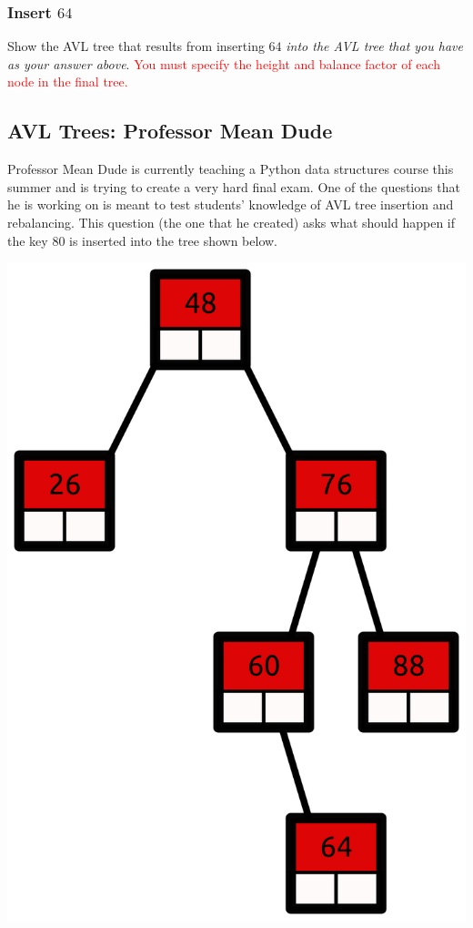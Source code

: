\documentclass{article}
\begin{document}
\begin{mdframed}
\vspace{3em}
\end{mdframed}

\subsubsection{Insert $64$}

Show the AVL tree that results from inserting $64$ \textit{into the AVL tree that you have as your answer above}. \textcolor{red}{You must specify the height and balance factor of each node in the final tree.}

\begin{mdframed}
\vspace{3em}
\end{mdframed}

\subsection{AVL Trees: Professor Mean Dude}

Professor Mean Dude is currently teaching a Python data structures course this summer and is trying to create a very hard final exam. One of the questions that he is working on is meant to test students' knowledge of AVL tree insertion and rebalancing. This question (the one that he created) asks what should happen if the key $80$ is inserted into the tree shown below.

\includegraphics[scale=0.3]{prof_mean_dude_avl_tree}
\end{document}
